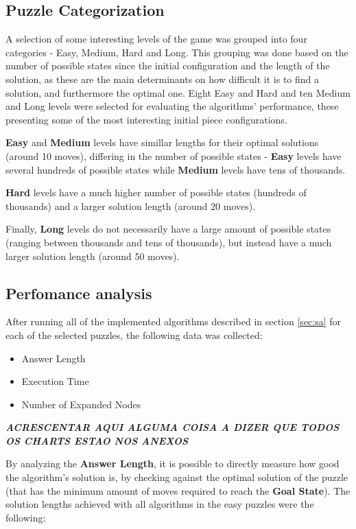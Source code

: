 \documentclass[conference]{IEEEtran}
\begin{document}
\subsection{Puzzle Categorization}

A selection of some interesting levels of the game was grouped into four categories - Easy, Medium, Hard and Long. This grouping was done based on the number of possible states since the initial configuration and the length of the solution, as these are the main determinants on how difficult it is to find a solution, and furthermore the optimal one. Eight Easy and Hard and ten Medium and Long levels were selected for evaluating the algorithms' performance, these presenting some of the most interesting initial piece configurations.

\textbf{Easy} and \textbf{Medium} levels have simillar lengths for their optimal solutions (around 10 moves), differing in the number of possible states - \textbf{Easy} levels have several hundreds of possible states while \textbf{Medium} levels have tens of thousands.

\textbf{Hard} levels have a much higher number of possible states (hundreds of thousands) and a larger solution length (around 20 moves).

Finally, \textbf{Long} levels do not necessarily have a large amount of possible states (ranging between thousands and tens of thousands), but instead have a much larger solution length (around 50 moves).

\subsection{Perfomance analysis}

After running all of the implemented algorithms described in section \autoref{sec:sa} for each of the selected puzzles, the following data was collected:

\begin{itemize}
    \item Answer Length
    \item Execution Time
    \item Number of Expanded Nodes
\end{itemize}


\textbf{\textit{ACRESCENTAR AQUI ALGUMA COISA A DIZER QUE TODOS OS CHARTS ESTAO NOS ANEXOS}}

By analyzing the \textbf{Answer Length}, it is possible to directly measure how good the algorithm's solution is, by checking against the optimal solution of the puzzle (that has the minimum amount of moves required to reach the \textbf{Goal State}). The solution lengths achieved with all algorithms in the easy puzzles were the following:
\end{document}
